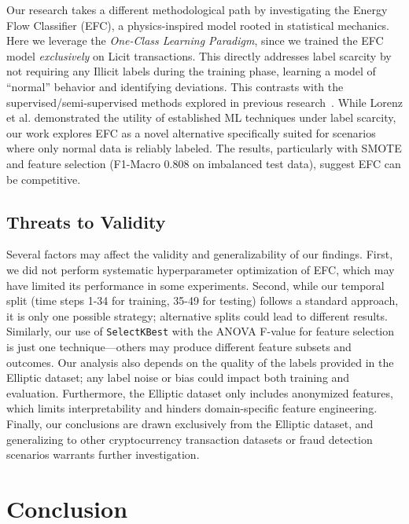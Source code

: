 \documentclass[12pt]{article}
\begin{document}
Our research takes a different methodological path by investigating the Energy Flow Classifier (EFC), a physics-inspired
model rooted in statistical mechanics. Here we leverage the  \emph{One-Class Learning Paradigm}, since we trained the EFC
model \textit{exclusively} on Licit transactions. This directly addresses label scarcity by not requiring any Illicit labels
during the training phase, learning a model of ``normal'' behavior and identifying deviations. This contrasts with the
supervised/semi-supervised methods explored in previous research~\cite{lorenz2021machinelearningmethodsdetect}.
While Lorenz et al. demonstrated the utility of established ML techniques under label scarcity, our work explores EFC as
a novel alternative specifically suited for scenarios where only normal data is reliably labeled. The results, particularly
with SMOTE and feature selection (F1-Macro 0.808 on imbalanced test data), suggest EFC can be competitive. 

\subsection{Threats to Validity}\label{sec:threats}

Several factors may affect the validity and generalizability of our findings. First, we did not perform systematic hyperparameter
optimization of EFC, which may have limited its performance in some experiments. Second, while our temporal split (time
steps 1-34 for training, 35-49 for testing) follows a standard approach, it is only one possible strategy; alternative
splits could lead to different results. Similarly, our use of \texttt{SelectKBest} with the ANOVA F-value for feature
selection is just one technique---others may produce different feature subsets and outcomes.
Our analysis also depends on the quality of the labels provided in the Elliptic dataset; any label noise or bias could
impact both training and evaluation. Furthermore, the Elliptic dataset only includes anonymized features, which limits
interpretability and hinders domain-specific feature engineering. Finally, our conclusions are drawn exclusively from
the Elliptic dataset, and generalizing to other cryptocurrency transaction datasets or fraud detection scenarios warrants
further investigation.

\section{Conclusion} \label{section:conclusion}
\end{document}
